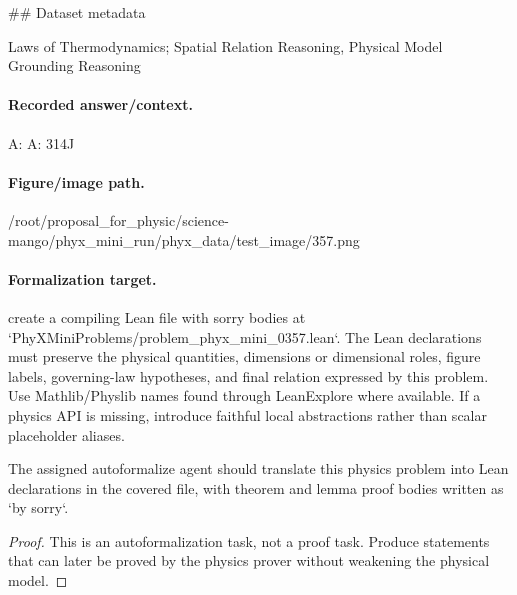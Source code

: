 \#\# Dataset metadata

Laws of Thermodynamics; Spatial Relation Reasoning, Physical Model Grounding Reasoning

\paragraph{Recorded answer/context.}
A: A: 314J

\paragraph{Figure/image path.}
/root/proposal\_for\_physic/science-mango/phyx\_mini\_run/phyx\_data/test\_image/357.png

\paragraph{Formalization target.}
create a compiling Lean file with sorry bodies at `PhyXMiniProblems/problem\_phyx\_mini\_0357.lean`. The Lean declarations must preserve the physical quantities, dimensions or dimensional roles, figure labels, governing-law hypotheses, and final relation expressed by this problem.
Use Mathlib/Physlib names found through LeanExplore where available. If a physics API is missing, introduce faithful local abstractions rather than scalar placeholder aliases.

\begin{theorem}
\label{thm:physics:phyx_mini_0357:target}
The assigned autoformalize agent should translate this physics problem into Lean declarations in the covered file, with theorem and lemma proof bodies written as `by sorry`.
\end{theorem}
\begin{proof}
This is an autoformalization task, not a proof task. Produce statements that can later be proved by the physics prover without weakening the physical model.
\end{proof}

